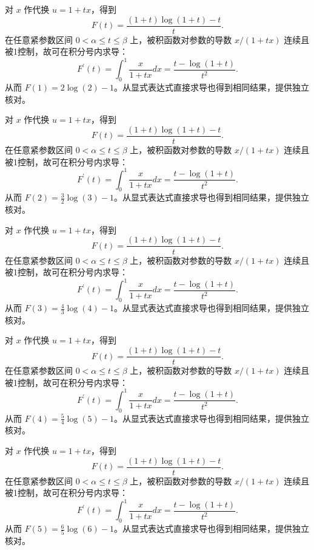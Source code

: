 \documentclass[12pt,fontset=fandol]{ctexart}
\begin{document}
\begin{solve}\label{ans:c20q19}
对 $x$ 作代换 $u=1+tx$，得到
\[
F(t)=\frac{(1+t)\log(1+t)-t}{t}.
\]
在任意紧参数区间 $0<\alpha\le t\le\beta$ 上，被积函数对参数的导数 $x/(1+tx)$ 连续且被1控制，故可在积分号内求导：
\[
F^{\prime}(t)=\int_0^1\frac{x}{1+tx}dx=\frac{t-\log(1+t)}{t^2}.
\]
从而 $F(1)=2\log(2)-1$。从显式表达式直接求导也得到相同结果，提供独立核对。
\end{solve}

\begin{solve}\label{ans:c20q20}
对 $x$ 作代换 $u=1+tx$，得到
\[
F(t)=\frac{(1+t)\log(1+t)-t}{t}.
\]
在任意紧参数区间 $0<\alpha\le t\le\beta$ 上，被积函数对参数的导数 $x/(1+tx)$ 连续且被1控制，故可在积分号内求导：
\[
F^{\prime}(t)=\int_0^1\frac{x}{1+tx}dx=\frac{t-\log(1+t)}{t^2}.
\]
从而 $F(2)=\frac{3}{2}\log(3)-1$。从显式表达式直接求导也得到相同结果，提供独立核对。
\end{solve}

\begin{solve}\label{ans:c20q21}
对 $x$ 作代换 $u=1+tx$，得到
\[
F(t)=\frac{(1+t)\log(1+t)-t}{t}.
\]
在任意紧参数区间 $0<\alpha\le t\le\beta$ 上，被积函数对参数的导数 $x/(1+tx)$ 连续且被1控制，故可在积分号内求导：
\[
F^{\prime}(t)=\int_0^1\frac{x}{1+tx}dx=\frac{t-\log(1+t)}{t^2}.
\]
从而 $F(3)=\frac{4}{3}\log(4)-1$。从显式表达式直接求导也得到相同结果，提供独立核对。
\end{solve}

\begin{solve}\label{ans:c20q22}
对 $x$ 作代换 $u=1+tx$，得到
\[
F(t)=\frac{(1+t)\log(1+t)-t}{t}.
\]
在任意紧参数区间 $0<\alpha\le t\le\beta$ 上，被积函数对参数的导数 $x/(1+tx)$ 连续且被1控制，故可在积分号内求导：
\[
F^{\prime}(t)=\int_0^1\frac{x}{1+tx}dx=\frac{t-\log(1+t)}{t^2}.
\]
从而 $F(4)=\frac{5}{4}\log(5)-1$。从显式表达式直接求导也得到相同结果，提供独立核对。
\end{solve}

\begin{solve}\label{ans:c20q23}
对 $x$ 作代换 $u=1+tx$，得到
\[
F(t)=\frac{(1+t)\log(1+t)-t}{t}.
\]
在任意紧参数区间 $0<\alpha\le t\le\beta$ 上，被积函数对参数的导数 $x/(1+tx)$ 连续且被1控制，故可在积分号内求导：
\[
F^{\prime}(t)=\int_0^1\frac{x}{1+tx}dx=\frac{t-\log(1+t)}{t^2}.
\]
从而 $F(5)=\frac{6}{5}\log(6)-1$。从显式表达式直接求导也得到相同结果，提供独立核对。
\end{solve}
\end{document}
